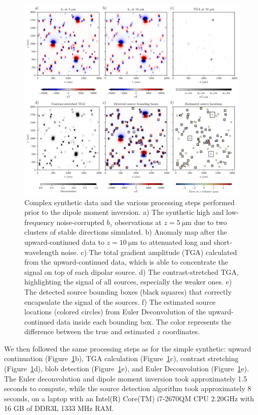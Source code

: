 \begin{figure}[tb!]
  \centering
  \includegraphics[width=1\linewidth]{figures/complex-synthetic-data.png}
  \caption{
    Complex synthetic data and the various processing steps performed prior to the dipole moment inversion.
    a) The synthetic high and low-frequency noise-corrupted $b_z$ observations at
    $z = \qty{5}{\micro\meter}$ due to two clusters of stable directions simulated.
    b) Anomaly map after the upward-continued data to $z = \qty{10}{\micro\meter}$ to attenuated long and short-wavelength noise.
    c) The total gradient amplitude (TGA) calculated from the
    upward-continued data, which is able to concentrate the signal on top
    of each dipolar source.
    d) The contrast-stretched TGA, highlighting the signal of all sources, especially the weaker ones.
    e) The detected source bounding boxes (black squares) that correctly
    encapsulate the signal of the sources.
    f) The estimated source locations (colored circles) from Euler
    Deconvolution of the upward-continued data inside each bounding box.
    The color represents the difference between the true and estimated
    $z$ coordinates.
  }
  \label{complex-synthetic-data}
\end{figure}

We then followed the same processing steps as for the simple synthetic: upward continuation (Figure~\ref{complex-synthetic-data}b),
TGA calculation (Figure~\ref{complex-synthetic-data}c), contrast stretching (Figure~\ref{complex-synthetic-data}d), blob detection (Figure~\ref{complex-synthetic-data}e), and Euler Deconvolution (Figure~\ref{complex-synthetic-data}e).
The Euler deconvolution and dipole moment inversion took approximately 1.5 seconds to compute, while
the source detection algorithm took approximately 8 seconds, on a laptop with an Intel(R) Core(TM) i7-2670QM CPU 2.20GHz with 16 GB of DDR3L 1333 MHz RAM.

